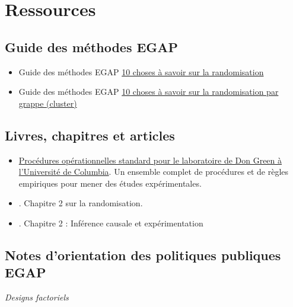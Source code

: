\documentclass[
  12pt,
]{book}
\begin{document}
\hypertarget{ressources-2}{%
\section{Ressources}\label{ressources-2}}

\hypertarget{guide-des-muxe9thodes-egap-2}{%
\subsection{Guide des méthodes EGAP}\label{guide-des-muxe9thodes-egap-2}}

\begin{itemize}
\item
  Guide des méthodes EGAP \href{https://egap.org/resource/10-things-to-know-about-randomization/}{10 choses à savoir sur la randomisation}
\item
  Guide des méthodes EGAP \href{https://egap.org/resource/10-things-to-know-about-cluster-randomization/}{10 choses à savoir sur la randomisation par grappe (cluster)}
\end{itemize}

\hypertarget{livres-chapitres-et-articles-1}{%
\subsection{Livres, chapitres et articles}\label{livres-chapitres-et-articles-1}}

\begin{itemize}
\item
  \href{https://github.com/acoppock/Green-Lab-SOP}{Procédures opérationnelles standard pour le laboratoire de Don Green à l'Université de Columbia}. Un ensemble complet de procédures et de règles empiriques pour mener des études expérimentales.
\item
  \autocite{glennerster_running_2013}. Chapitre 2 sur la randomisation.
\item
  \autocite{gerber_field_2012}. Chapitre 2 : Inférence causale et expérimentation
\end{itemize}

\hypertarget{notes-dorientation-des-politiques-publiques-egap-1}{%
\subsection{Notes d'orientation des politiques publiques EGAP}\label{notes-dorientation-des-politiques-publiques-egap-1}}

\emph{Designs factoriels}
\end{document}
